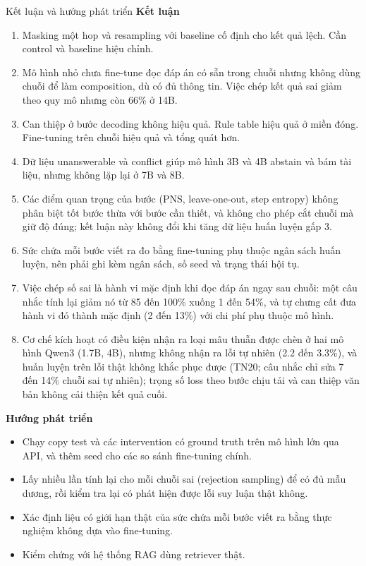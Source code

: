 \documentclass[aspectratio=169,t,10pt]{beamer}
\begin{document}
\begin{frame}[shrink]{Kết luận và hướng phát triển}
\textbf{Kết luận}
\begin{enumerate}
  \item Masking một hop và resampling với baseline cố định cho kết quả lệch. Cần control và baseline hiệu chỉnh.
  \item Mô hình nhỏ chưa fine-tune đọc đáp án có sẵn trong chuỗi nhưng không dùng chuỗi để làm composition, dù có đủ thông tin. Việc chép kết quả sai giảm theo quy mô nhưng còn 66\% ở 14B.
  \item Can thiệp ở bước decoding không hiệu quả. Rule table hiệu quả ở miền đóng. Fine-tuning trên chuỗi hiệu quả và tổng quát hơn.
  \item Dữ liệu unanswerable và conflict giúp mô hình 3B và 4B abstain và bám tài liệu, nhưng không lặp lại ở 7B và 8B.
  \item Các điểm quan trọng của bước (PNS, leave-one-out, step entropy) không phân biệt tốt bước thừa với bước cần thiết, và không cho phép cắt chuỗi mà giữ độ đúng; kết luận này không đổi khi tăng dữ liệu huấn luyện gấp 3.
  \item Sức chứa mỗi bước viết ra đo bằng fine-tuning phụ thuộc ngân sách huấn luyện, nên phải ghi kèm ngân sách, số seed và trạng thái hội tụ.
  \item Việc chép số sai là hành vi mặc định khi đọc đáp án ngay sau chuỗi: một câu nhắc tính lại giảm nó từ 85 đến 100\% xuống 1 đến 54\%, và tự chưng cất đưa hành vi đó thành mặc định (2 đến 13\%) với chi phí phụ thuộc mô hình.
  \item Cơ chế kích hoạt có điều kiện nhận ra loại mâu thuẫn được chèn ở hai mô hình Qwen3 (1.7B, 4B), nhưng không nhận ra lỗi tự nhiên (2.2 đến 3.3\%), và huấn luyện trên lỗi thật không khắc phục được (TN20; câu nhắc chỉ sửa 7 đến 14\% chuỗi sai tự nhiên); trọng số loss theo bước chịu tải và can thiệp văn bản không cải thiện kết quả cuối.
\end{enumerate}
\vspace{3pt}
\textbf{Hướng phát triển}
\begin{itemize}
  \item Chạy copy test và các intervention có ground truth trên mô hình lớn qua API, và thêm seed cho các so sánh fine-tuning chính.
  \item Lấy nhiều lần tính lại cho mỗi chuỗi sai (rejection sampling) để có đủ mẫu dương, rồi kiểm tra lại có phát hiện được lỗi suy luận thật không.
  \item Xác định liệu có giới hạn thật của sức chứa mỗi bước viết ra bằng thực nghiệm không dựa vào fine-tuning.
  \item Kiểm chứng với hệ thống RAG dùng retriever thật.
\end{itemize}
\end{frame}
\end{document}
